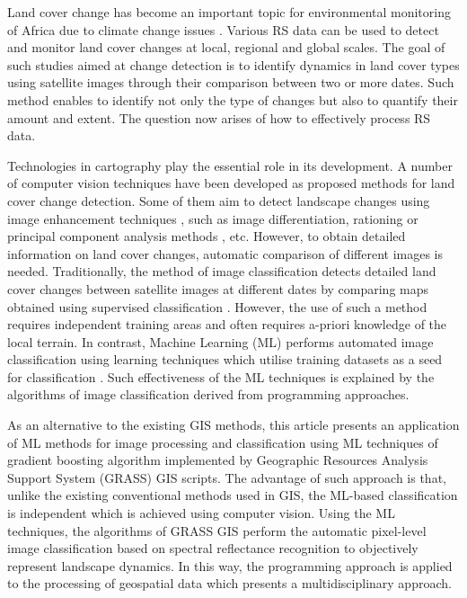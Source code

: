 \documentclass[jimaging,article,submit,pdftex,moreauthors]{Definitions/mdpi}
\begin{document}
Land cover change has become an important topic for environmental monitoring of Africa due to climate change issues \cite{Springer2023}. Various RS data can be used to detect and monitor land cover changes at local, regional and global scales. The goal of such studies aimed at change detection is to identify dynamics in land cover types using satellite images through their comparison between two or more dates. Such method enables to identify not only the type of changes but also to quantify their amount and extent. The question now arises of how to effectively process RS data. 

Technologies in cartography play the essential role in its development. A number of computer vision techniques have been developed as proposed methods for land cover change detection. Some of them aim to detect landscape changes using image enhancement techniques \cite{Dyson2024}, such as image differentiation, rationing or principal component analysis methods \cite{7877513}, etc. However, to obtain detailed information on land cover changes, automatic comparison of different images is needed. Traditionally, the method of image classification detects detailed land cover changes between satellite images at different dates by comparing maps obtained using supervised classification \cite{su13084092,NATARAJAN2016256}. However, the use of such a method requires independent training areas and often requires a-priori knowledge of the local terrain. In contrast, Machine Learning (ML) performs automated image classification using learning techniques which utilise training datasets as a seed for classification \cite{FERCHICHI2024122211}. Such effectiveness of the ML techniques is explained by the algorithms of image classification derived from programming approaches. 

As an alternative to the existing GIS methods, this article presents an application of ML methods for image processing and classification using ML techniques of gradient boosting algorithm implemented by Geographic Resources Analysis Support System (GRASS) GIS scripts. The advantage of such approach is that, unlike the existing conventional methods used in GIS, the ML-based classification is independent which is achieved using computer vision. Using the ML techniques, the algorithms of GRASS GIS perform the automatic pixel-level image classification based on spectral reflectance recognition to objectively represent landscape dynamics. In this way, the programming approach is applied to the processing of geospatial data which presents a multidisciplinary approach.
\end{document}
